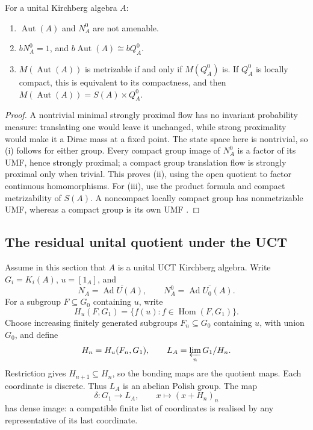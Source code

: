 \begin{corollary}\label{cor:un-kirchberg-dynamics}
For a unital Kirchberg algebra \(A\):
\begin{enumerate}
\item \(\operatorname{Aut}(A)\) and \(N_A^0\) are not amenable.
\item \(bN_A^0=1\), and \(b\operatorname{Aut}(A)\cong bQ_A^0\).
\item \(M(\operatorname{Aut}(A))\) is metrizable if and only if \(M(Q_A^0)\) is.
If \(Q_A^0\) is locally compact, this is equivalent to its
compactness, and then \(M(\operatorname{Aut}(A))=S(A)\times Q_A^0\).
\end{enumerate}
\end{corollary}
\begin{proof}
A nontrivial minimal strongly proximal flow has no invariant
probability measure: translating one would leave it unchanged,
while strong proximality would make it a Dirac mass at a fixed point.
The state space here is nontrivial, so (i) follows for either group.
Every compact group image of \(N_A^0\) is a factor of its UMF,
hence strongly proximal; a compact group translation flow is
strongly proximal only when trivial. This proves (ii), using the
open quotient to factor continuous homomorphisms.
For (iii), use the product formula and compact metrizability of
\(S(A)\). A noncompact locally compact group has nonmetrizable
UMF, whereas a compact group is its own UMF \cite{Pestov2006}.
\end{proof}


\subsection{The residual unital quotient under the UCT}\label{sec:un-uct}

Assume in this section that \(A\) is a unital UCT Kirchberg algebra.
Write \(G_i=K_i(A)\), \(u=[1_A]\), and
\[
 N_A=\overline{\operatorname{Ad} U(A)},\qquad N_A^0=\overline{\operatorname{Ad} U_0(A)}.
\]
For a subgroup \(F\subseteq G_0\) containing \(u\), write
\[
 H_u(F,G_1)=\{f(u):f\in\operatorname{Hom}(F,G_1)\}.
\]
Choose increasing finitely generated subgroups \(F_n\subseteq G_0\)
containing \(u\), with union \(G_0\), and define
\begin{equation}\label{eq:un-l}
 H_n=H_u(F_n,G_1),\qquad
 L_A=\varprojlim_n G_1/H_n.
\end{equation}
Restriction gives \(H_{n+1}\subseteq H_n\), so the bonding maps
are the quotient maps. Each coordinate is discrete. Thus \(L_A\)
is an abelian Polish group. The map
\[
 \delta:G_1\longrightarrow L_A,\qquad
 x\longmapsto(x+H_n)_n
\]
has dense image: a compatible finite list of coordinates is realised
by any representative of its last coordinate.

